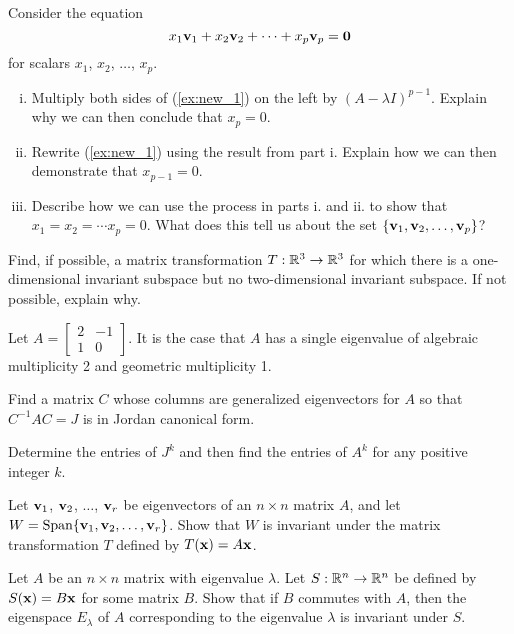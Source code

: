 	\item Consider the equation 
	\begin{equation} \label{ex:new_1}
x_1 \mathbf{v}_1 + x_2 \mathbf{v}_2 + \cdots + x_p \mathbf{v}_p = \mathbf{0}
\end{equation}
for scalars $x_1$, $x_2$, $\ldots$, $x_p$. 
		\begin{enumerate}[i.]
		\item Multiply both sides of (\ref{ex:new_1}) on the left by $(A-\lambda I)^{p-1}$. Explain why we can then conclude that $x_p = 0$. 
		
		\item Rewrite (\ref{ex:new_1}) using the result from part i. Explain how we can then demonstrate that $x_{p-1} = 0$. 
		
		\item Describe how we can use the process in parts i. and ii. to show that $x_1 = x_2 = \cdots x_p = 0$. What does this tell us about the set $\{\mathbf{v}_1, \mathbf{v}_2, \ldots, \mathbf{v}_p\}$?

		\end{enumerate}
	\ea

	
\item Find, if possible, a matrix transformation $T:\mathbb{R}^3 \to \mathbb{R}^3$ for which there is a one-dimensional invariant subspace but no two-dimensional invariant subspace. If not possible, explain why.


\item Let $A = \left[ \begin{array}{cr} 2&-1\\1&0 \end{array} \right]$. It is the case that $A$ has a single eigenvalue of algebraic multiplicity 2 and geometric multiplicity 1. 	
	\ba
	\item Find a matrix $C$ whose columns are generalized eigenvectors for $A$ so that $C^{-1}AC=J$ is in Jordan canonical form.
	\item Determine the entries of $J^k$ and then find the entries of $A^k$ for any positive integer $k$. 
	\ea

\item  Let $\mathbf{v}_1$, $\mathbf{v}_2$, $\ldots$, $\mathbf{v}_r$ be eigenvectors of an $n \times n$ matrix $A$, and let $W = \text{Span}\{\mathbf{v}_1, \mathbf{v}_2, \ldots, \mathbf{v}_r\}$. Show that $W$ is invariant under the matrix transformation $T$ defined by $T(\mathbf{x}) = A\mathbf{x}$. 

\item Let $A$ be an $n \times n$ matrix with eigenvalue $\lambda$. Let $S:\mathbb{R}^n \to \mathbb{R}^n$ be defined by $S(\mathbf{x}) = B\mathbf{x}$ for some matrix $B$. Show that if $B$ commutes with $A$, then the eigenspace $E_\lambda$ of $A$ corresponding to the eigenvalue $\lambda$ is invariant under $S$. 

